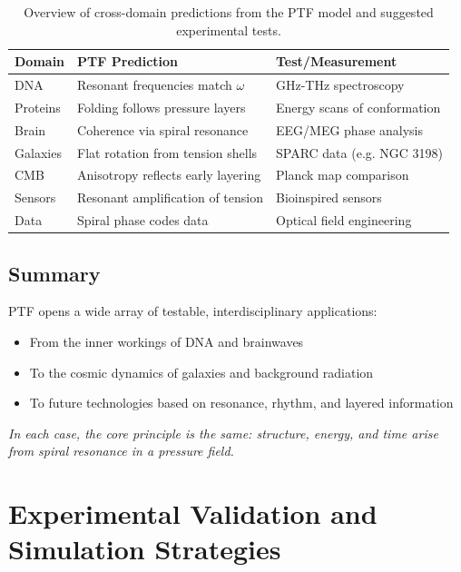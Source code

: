 \documentclass[a4paper,12pt]{article}
\begin{document}
\begin{table}[H]
\centering
\begin{tabular}{|l|l|l|}
\hline
\textbf{Domain} & \textbf{PTF Prediction} & \textbf{Test/Measurement} \\
\hline
DNA & Resonant frequencies match $\omega$ & GHz-THz spectroscopy \\
Proteins & Folding follows pressure layers & Energy scans of conformation \\
Brain & Coherence via spiral resonance & EEG/MEG phase analysis \\
Galaxies & Flat rotation from tension shells & SPARC data (e.g. NGC 3198) \\
CMB & Anisotropy reflects early layering & Planck map comparison \\
Sensors & Resonant amplification of tension & Bioinspired sensors \\
Data & Spiral phase codes data & Optical field engineering \\
\hline
\end{tabular}
\caption{Overview of cross-domain predictions from the PTF model and suggested experimental tests.}
\label{tab:ptf_predictions}
\end{table}

\subsection{Summary}

PTF opens a wide array of testable, interdisciplinary applications:
\begin{itemize}
    \item From the inner workings of DNA and brainwaves
    \item To the cosmic dynamics of galaxies and background radiation
    \item To future technologies based on resonance, rhythm, and layered information
\end{itemize}

\vspace{1em}
\noindent
\textit{In each case, the core principle is the same: structure, energy, and time arise from spiral resonance in a pressure field.}

\section{Experimental Validation and Simulation Strategies}
\label{sec:experiments_simulation}
\end{document}
